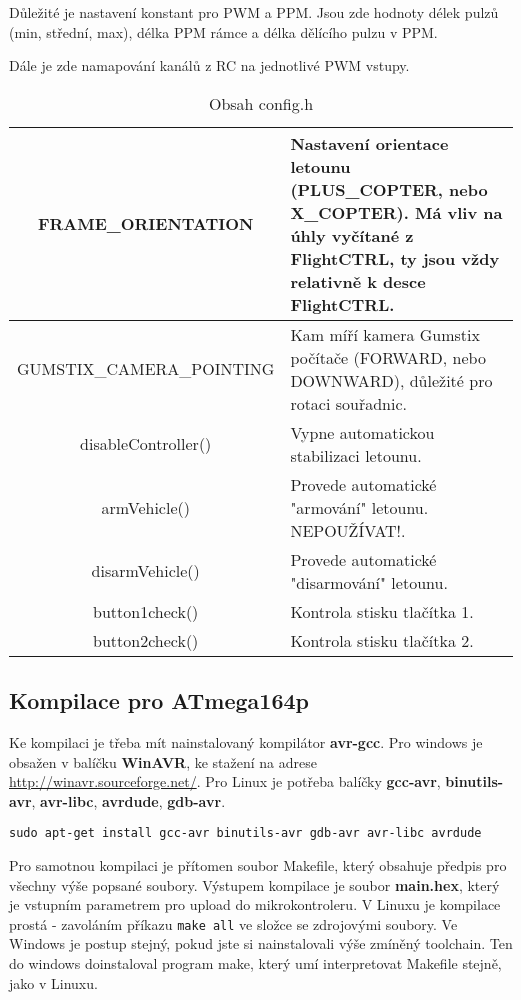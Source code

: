 \documentclass[11pt, a4paper]{article}
\begin{document}
Důležité je nastavení konstant pro PWM a PPM. Jsou zde hodnoty délek pulzů (min, střední, max), délka PPM rámce a délka dělícího pulzu v PPM.

Dále je zde namapování kanálů z RC na jednotlivé PWM vstupy.

\begin{table}
\begin{center}
\begin{tabular}{| c | p{8cm} |}
\hline
FRAME\_ORIENTATION & Nastavení orientace letounu (PLUS\_COPTER, nebo X\_COPTER). Má vliv na úhly vyčítané z FlightCTRL, ty jsou vždy relativně k desce FlightCTRL. \\
\hline
GUMSTIX\_CAMERA\_POINTING & Kam míří kamera Gumstix počítače (FORWARD, nebo DOWNWARD), důležité pro rotaci souřadnic.\\
\hline
disableController() & Vypne automatickou stabilizaci letounu.\\
\hline
armVehicle() & Provede automatické "armování" letounu. NEPOUŽÍVAT!.\\
\hline
disarmVehicle() & Provede automatické "disarmování" letounu.\\
\hline
button1check() & Kontrola stisku tlačítka 1.\\
\hline
button2check() & Kontrola stisku tlačítka 2.\\
\hline
\end{tabular}
\caption{Obsah config.h}
\label{tab:config.h}
\end{center}
\end{table}

\subsection{Kompilace pro ATmega164p}

Ke kompilaci je třeba mít nainstalovaný kompilátor \textbf{avr-gcc}. Pro windows je obsažen v balíčku \textbf{WinAVR}, ke stažení na adrese \url{http://winavr.sourceforge.net/}. Pro Linux je potřeba balíčky \textbf{gcc-avr}, \textbf{binutils-avr}, \textbf{avr-libc}, \textbf{avrdude}, \textbf{gdb-avr}.

\texttt{sudo apt-get install gcc-avr binutils-avr gdb-avr avr-libc avrdude}

Pro samotnou kompilaci je přítomen soubor Makefile, který obsahuje předpis pro všechny výše popsané soubory. Výstupem kompilace je soubor \textbf{main.hex}, který je vstupním parametrem pro upload do mikrokontroleru. V Linuxu je kompilace prostá - zavoláním příkazu \texttt{make~all} ve složce se zdrojovými soubory. Ve Windows je postup stejný, pokud jste si nainstalovali výše zmíněný toolchain. Ten do windows doinstaloval program make, který umí interpretovat Makefile stejně, jako v Linuxu.
\end{document}
